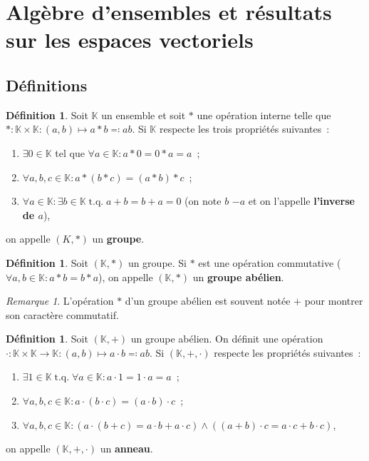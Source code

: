 \documentclass{article}
\DeclareMathOperator{\tq}{\text{ t.q. }}
\newcommand{\K}{\mathbb K}
\theoremstyle{definition}
\newtheorem{déf}[thm]{Définition}
\theoremstyle{remark}
\newtheorem*{rmq}{Remarque}
\begin{document}
\newpage
\section{Algèbre d'ensembles et résultats sur les espaces vectoriels}
	\subsection{Définitions}
		\begin{déf} Soit $\K$ un ensemble et soit $*$ une opération interne telle que $* : \K \times \K : (a, b) \mapsto a*b \eqqcolon ab$. Si $\K$ respecte les
		trois propriétés suivantes~:

		\begin{enumerate}
			\item $\exists 0 \in \K$ tel que $\forall a \in \K : a * 0 = 0 * a = a$~;
			\item $\forall a, b, c \in \K : a * (b*c) = (a*b) * c$~;
			\item $\forall a \in \K : \exists b \in \K \tq a + b = b + a = 0$ (on note $b$ $-a$ et on l'appelle \textbf{l'inverse de $a$}),
		\end{enumerate}
		on appelle $(K, *)$ un \textbf{groupe}.\end{déf}

		\begin{déf} Soit $(\K, *)$ un groupe. Si $*$ est une opération commutative ($\forall a, b \in \K : a * b = b * a$), on appelle $(\K, *)$ un
		\textbf{groupe abélien}. \end{déf}

		\begin{rmq} L'opération $*$ d'un groupe abélien est souvent notée $+$ pour montrer son caractère commutatif. \end{rmq}

		\begin{déf} Soit $(\K, +)$ un groupe abélien. On définit une opération $\cdot : \K \times \K \to \K : (a, b) \mapsto a \cdot b \eqqcolon ab$.
		Si $(\K, +, \cdot)$ respecte les propriétés suivantes~:

		\begin{enumerate}
			\item $\exists 1 \in \K \tq \forall a \in \K : a \cdot 1 = 1 \cdot a = a$~;
			\item $\forall a, b, c \in \K : a \cdot (b \cdot c) = (a \cdot b) \cdot c$~;
			\item $\forall a, b, c \in \K : (a \cdot (b + c) = a \cdot b + a \cdot c) \land ((a + b) \cdot c = a \cdot c + b \cdot c)$,
		\end{enumerate}
		on appelle $(\K, +, \cdot)$ un \textbf{anneau}. \end{déf}
\end{document}
